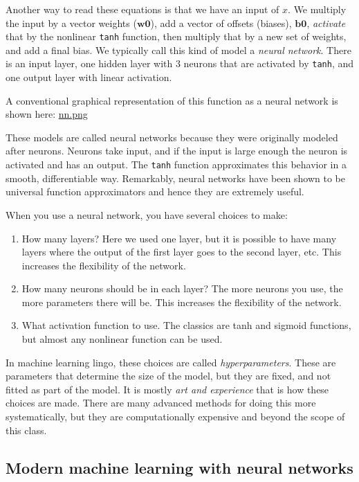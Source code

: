 \documentclass[11pt]{article}
\begin{document}
Another way to read these equations is that we have an input of \(x\). We multiply the input by a vector weights (\(\mathbf{w0}\)), add a vector of offsets (biases), \(\mathbf{b0}\), \emph{activate} that by the nonlinear \texttt{tanh} function, then multiply that by a new set of weights, and add a final bias. We typically call this kind of model a \emph{neural network}. There is an input layer, one hidden layer with 3 neurons that are activated by \texttt{tanh}, and one output layer with linear activation.

A conventional graphical representation of this function as a neural network is shown here:
\url{nn.png}


These models are called neural networks because they were originally modeled after neurons. Neurons take input, and if the input is large enough the neuron is activated and has an output. The \texttt{tanh} function approximates this behavior in a smooth, differentiable way. Remarkably, neural networks have been shown to be universal function approximators and hence they are extremely useful.

When you use a neural network, you have several choices to make:

\begin{enumerate}
\item How many layers? Here we used one layer, but it is possible to have many layers where the output of the first layer goes to the second layer, etc.  This increases the flexibility of the network.
\item How many neurons should be in each layer? The more neurons you use, the more parameters there will be. This increases the flexibility of the network.
\item What activation function to use. The classics are tanh and sigmoid functions, but almost any nonlinear function can be used.
\end{enumerate}

In machine learning lingo, these choices are called \emph{hyperparameters}. These are parameters that determine the size of the model, but they are fixed, and not fitted as part of the model. It is mostly \emph{art and experience} that is how these choices are made. There are many advanced methods for doing this more systematically, but they are computationally expensive and beyond the scope of this class.


\subsection{Modern machine learning with neural networks}
\label{sec:org64b3d3a}
\end{document}
